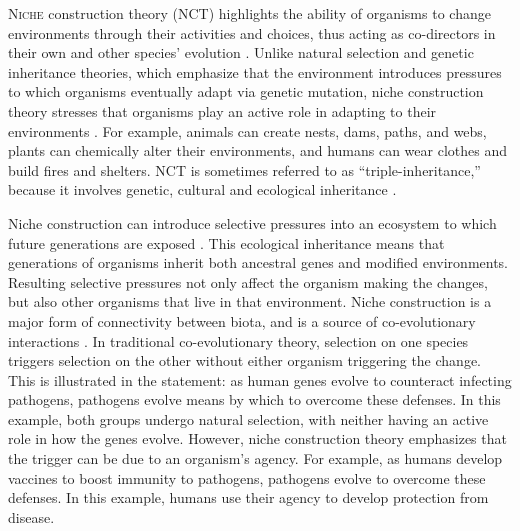 	
\lettrine[nindent=0em,lines=3]{N}{iche}  construction theory (NCT) highlights the ability of organisms to change environments through their activities and choices, thus acting as co-directors in their own and other species’ evolution \parencite[2]{Odling-Smee_2003}. 
Unlike natural selection and genetic inheritance theories, which emphasize that the environment introduces pressures to which organisms eventually adapt via genetic mutation, niche construction theory stresses that organisms play an active role in adapting to their environments \parencite[304]{Laland_2010a}. 
For example, animals can create nests, dams, paths, and webs, plants can chemically alter their environments, and humans can wear clothes and build fires and shelters. 
NCT is sometimes referred to as “triple-inheritance,” because it involves genetic, cultural and ecological inheritance \parencites[643]{Odling-Smee_1996}[251]{Odling-Smee_2003}.

	Niche construction can introduce selective pressures into an ecosystem to which future generations are exposed \parencite[135]{Laland_2000}. 
This ecological inheritance means that generations of organisms inherit both ancestral genes and modified environments. Resulting selective pressures not only affect the organism making the changes, but also other organisms that live in that environment. Niche construction is a major form of connectivity between biota, and is a source of co-evolutionary interactions 
\parencite[201]{Odling-Smee_2003}. 
In traditional co-evolutionary theory, selection on one species triggers selection on the other without either organism triggering the change. This is illustrated in the statement: as human genes evolve to counteract infecting pathogens, pathogens evolve means by which to overcome these defenses. 
In this example, both groups undergo natural selection, with neither having an active role in how the genes evolve. However, niche construction theory emphasizes that the trigger can be due to an organism’s agency. For example, as humans develop vaccines to boost immunity to pathogens, pathogens evolve to overcome these defenses. In this example, humans use their agency to develop protection from disease. 

